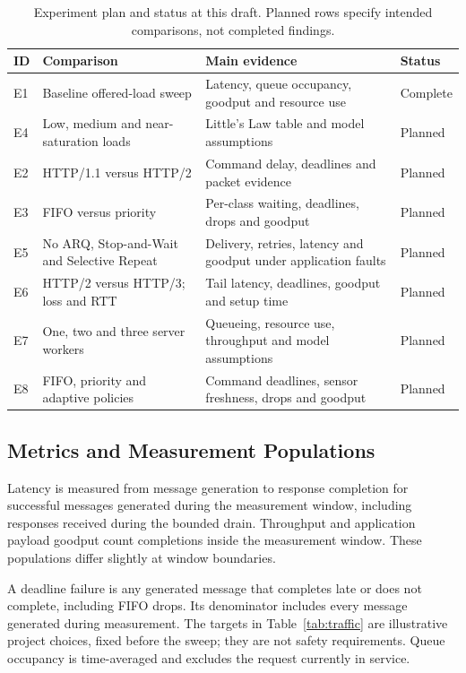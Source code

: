 \documentclass[10pt,a4paper,twocolumn,twoside]{tau-class/tau}
\begin{document}
\begin{table}[t]
    \centering
    \caption{Experiment plan and status at this draft. Planned rows specify
    intended comparisons, not completed findings.}
    \label{tab:experiment-map}
    \small
    \begin{tabular}{@{}lp{}p{}l@{}}
        \toprule
        ID & Comparison & Main evidence & Status \\
        \midrule
        E1 & Baseline offered-load sweep & Latency, queue occupancy, goodput and resource use & Complete \\
        E4 & Low, medium and near-saturation loads & Little's Law table and model assumptions & Planned \\
        E2 & HTTP/1.1 versus HTTP/2 & Command delay, deadlines and packet evidence & Planned \\
        E3 & FIFO versus priority & Per-class waiting, deadlines, drops and goodput & Planned \\
        E5 & No ARQ, Stop-and-Wait and Selective Repeat & Delivery, retries, latency and goodput under application faults & Planned \\
        E6 & HTTP/2 versus HTTP/3; loss and RTT & Tail latency, deadlines, goodput and setup time & Planned \\
        E7 & One, two and three server workers & Queueing, resource use, throughput and model assumptions & Planned \\
        E8 & FIFO, priority and adaptive policies & Command deadlines, sensor freshness, drops and goodput & Planned \\
        \bottomrule
    \end{tabular}
\end{table}

\subsection{Metrics and Measurement Populations}
Latency is measured from message generation to response completion for
successful messages generated during the measurement window, including
responses received during the bounded drain. Throughput and application
payload goodput count completions inside the measurement window. These
populations differ slightly at window boundaries.

A deadline failure is any generated message that completes late or does
not complete, including FIFO drops. Its denominator includes every message
generated during measurement. The targets in Table~\ref{tab:traffic} are
illustrative project choices, fixed before the sweep; they are not safety
requirements. Queue occupancy is time-averaged and excludes the request
currently in service.
\end{document}

